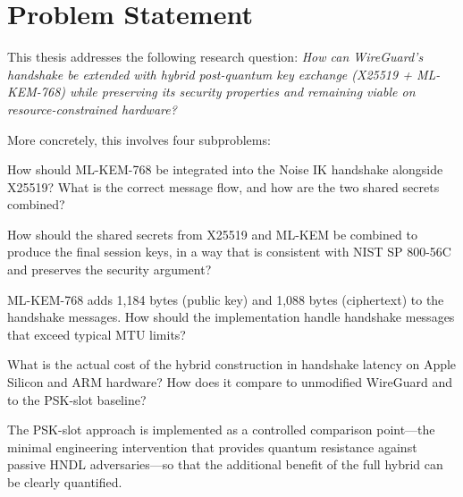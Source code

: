 \chapter{Problem Statement}
\label{chap:problem}

This thesis addresses the following research question: \emph{How can WireGuard's handshake be extended with hybrid post-quantum key exchange (X25519 + ML-KEM-768) while preserving its security properties and remaining viable on resource-constrained hardware?}

More concretely, this involves four subproblems:

\begin{description}[style=nextline, leftmargin=0pt]
    \item[SP1 (Handshake Integration)] How should ML-KEM-768 be integrated into the Noise IK handshake alongside X25519? What is the correct message flow, and how are the two shared secrets combined?
    
    \item[SP2 (Key Derivation)] How should the shared secrets from X25519 and ML-KEM be combined to produce the final session keys, in a way that is consistent with NIST SP 800-56C and preserves the security argument?
    
    \item[SP3 (MTU Management)] ML-KEM-768 adds 1,184 bytes (public key) and 1,088 bytes (ciphertext) to the handshake messages. How should the implementation handle handshake messages that exceed typical MTU limits?
    
    \item[SP4 (Performance)] What is the actual cost of the hybrid construction in handshake latency on Apple Silicon and ARM hardware? How does it compare to unmodified WireGuard and to the PSK-slot baseline?
\end{description}

The PSK-slot approach is implemented as a controlled comparison point---the minimal engineering intervention that provides quantum resistance against passive HNDL adversaries---so that the additional benefit of the full hybrid can be clearly quantified.

